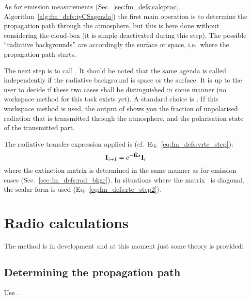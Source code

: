 As for emission measurements (Sec.~\ref{sec:fm_defs:calcproc},
Algorithm~\ref{alg:fm_defs:iyCSagenda}) the first main operation is to
determine the propagation path through the atmosphere, but this is here done
without considering the cloud-box (it is simple deactivated during this step).
The possible ``radiative backgrounds'' are accordingly the surface or space,
i.e.\ where the propagation path starts. 

The next step is to call . It should be
noted that the same agenda is called independently if the radiative background
is space or the surface. It is up to the user to decide if these two cases
shall be distinguished in some manner (no workspace method for this task exists
yet). A standard choice  is
. If this workspace method is used, the output of
 shows you the fraction of unpolarised
radiation that is transmitted through the atmosphere, and the polarisation
state of the transmitted part. 

The radiative transfer expression applied is
(cf.~Eq.~\ref{eq:fm_defs:vrte_step}):
\begin{equation}
  \label{eq:trans:vrte}
  {\bf I}_{i+1} = e^{-\bar{{\bf K}}s} {\bf I}_i 
\end{equation}
where the extinction matrix is determined in the same manner as for emission
cases (Sec.~\ref{sec:fm_defs:rad_bkgr}). In situations where the matrix
\ExtMat\ is diagonal, the scalar form is used (Eq.~\ref{eq:fm_defs:rte_step2}).








\section{Radio calculations}
\label{sec:radiolinks}

The  method is in development and at this moment just
some theory is provided:


\subsection{Determining the propagation path}
\label{sec:radiolinks:ppath}

Use .


